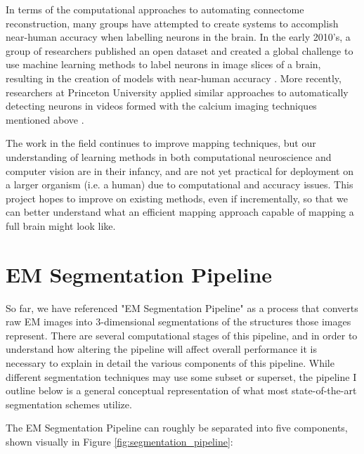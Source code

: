 In terms of the computational approaches to automating connectome reconstruction, many groups have attempted to create systems to accomplish near-human accuracy when labelling neurons in the brain. In the early 2010's, a group of researchers published an open dataset and created a global challenge to use machine learning methods to label neurons in image slices of a brain, resulting in the creation of models with near-human accuracy \cite{Arganda-Carreras2015}. More recently, researchers at Princeton University applied similar approaches to automatically detecting neurons in videos formed with the calcium imaging techniques mentioned above \cite{Apthorpe2016}.

The work in the field continues to improve mapping techniques, but our understanding of learning methods in both computational neuroscience and computer vision are in their infancy, and are not yet practical for deployment on a larger organism (i.e. a human) due to computational and accuracy issues. This project hopes to improve on existing methods, even if incrementally, so that we can better understand what an efficient mapping approach capable of mapping a full brain might look like.

\section{EM Segmentation Pipeline}

So far, we have referenced "EM Segmentation Pipeline" as a process that converts raw EM images into 3-dimensional segmentations of the structures those images represent. There are several computational stages of this pipeline, and in order to understand how altering the pipeline will affect overall performance it is necessary to explain in detail the various components of this pipeline. While different segmentation techniques may use some subset or superset, the pipeline I outline below is a general conceptual representation of what most state-of-the-art segmentation schemes utilize. 

The EM Segmentation Pipeline can roughly be separated into five components, shown visually in Figure \ref{fig:segmentation_pipeline}:

